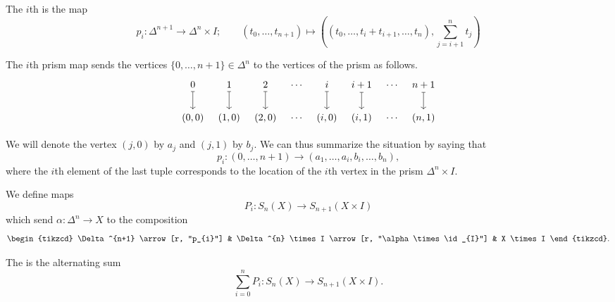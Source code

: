 \documentclass[main.tex]{subfiles}
\begin{document}
\begin{definition}
  \label{def:prism_maps}
  The \(i\)th  is the map
  \begin{equation*}
    p_{i}\colon \Delta^{n+1} \to \Delta^{n} \times I;\qquad (t_{0}, \ldots, t_{n+1}) \mapsto \left((t_{0}, \ldots, t_{i} + t_{i+1}, \ldots, t_{n}), \sum_{j = i+1}^{n} t_{j}\right)
  \end{equation*}
\end{definition}

The \(i\)th prism map sends the vertices \(\{0, \ldots, n + 1\} \in \Delta^{n}\) to the vertices of the prism as follows.
\begin{equation*}
  \begin{tikzcd}[column sep=tiny]
    0
    \arrow[d, mapsto]
    & 1
    \arrow[d, mapsto]
    & 2
    \arrow[d, mapsto]
    & \cdots
    & i
    \arrow[d, mapsto]
    & i+1
    \arrow[d, mapsto]
    & \cdots
    & n+1
    \arrow[d, mapsto]
    \\
    (0, 0)
    & (1, 0)
    & (2, 0)
    & \cdots
    & (i, 0)
    & (i, 1)
    & \cdots
    & (n, 1)
  \end{tikzcd}
\end{equation*}

We will denote the vertex \((j, 0)\) by \(a_{j}\) and \((j, 1)\) by \(b_{j}\). We can thus summarize the situation by saying that
\begin{equation*}
  p_{i}\colon (0, \ldots, n+1) \to (a_{1}, \ldots, a_{i}, b_{i}, \ldots, b_{n}),
\end{equation*}
where the \(i\)th element of the last tuple corresponds to the location of the \(i\)th vertex in the prism \(\Delta^{n} \times I\).

\begin{definition}
  \label{def:prism_operator}
  We define maps
  \begin{equation*}
    P_{i}\colon S_{n}(X) \to S_{n+1}(X \times I)
  \end{equation*}
  which send \(\alpha\colon \Delta^{n} \to X\) to the composition
  \begin{equation*}
    \begin{tikzcd}
      \Delta^{n+1}
      \arrow[r, "p_{i}"]
      & \Delta^{n} \times I
      \arrow[r, "\alpha \times \id_{I}"]
      & X \times I
    \end{tikzcd}.
  \end{equation*}

  The  is the alternating sum
  \begin{equation*}
    \sum_{i = 0}^{n} P_{i}\colon S_{n}(X) \to S_{n+1}(X \times I).
  \end{equation*}
\end{definition}
\end{document}
